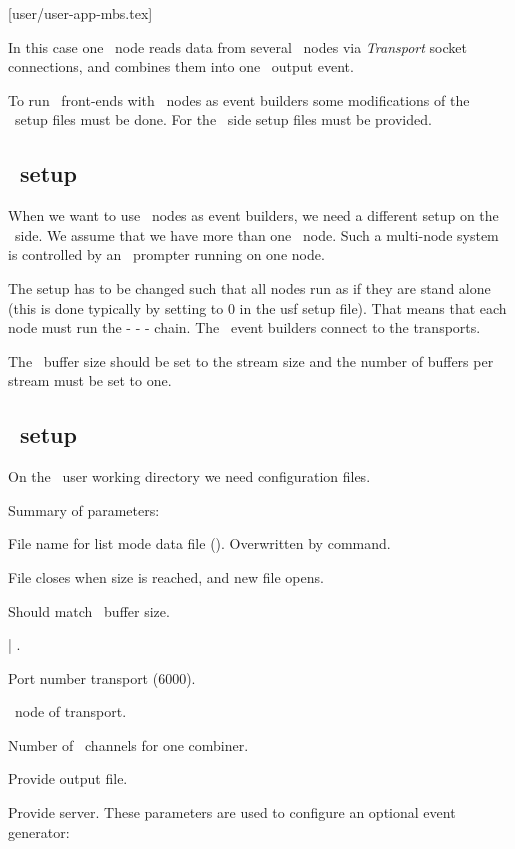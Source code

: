 [user/user-app-mbs.tex]
\label{user-app-mbs-chapter}


In this case one \dabc\ node reads data from several
\mbs\ nodes via {\em Transport} socket connections, and combines them
into one \mbs\ output event. 

To run \mbs\ front-ends with \dabc\ nodes as event builders some
modifications of the \mbs\ setup files must be done.
For the \dabc\ side setup files must be provided.

\subsection[MBS setup]{\mbs\ setup}
When we want to use \dabc\ nodes as event builders, we need a different
setup on the \mbs\ side. We assume that we have more than one
\mbs\ node. Such a multi-node system is controlled by an \mbs\ prompter running on one node.
\bbul
\item The setup has to be changed such that all nodes run as if they are stand alone
(this is done typically by setting  to 0 in the usf setup file).
That means that each node must run the  -  - 
 - 
chain. The \dabc\ event builders connect to the transports.
\item The \mbs\ buffer size should be set to the stream size and the number of buffers per
stream must be set to one.
\ebul

\subsection[DABC setup]{\dabc\ setup}
On the \dabc\ user working directory we need configuration files.

Summary of parameters:
\bdes
\item[MbsFileName] File name for list mode data file (). Overwritten by command.
\item[MbsFileSizeLimit] File closes when size is reached, and new file opens.
\item[BufferSize] Should match \mbs\ buffer size.
\item[MbsServerKind]  | .
\item[MbsServerPort] Port number transport (6000).
\item[MbsServerName] \mbs\ node of transport.
\item[NumInputs] Number of \mbs\ channels for one combiner.
\item[DoFile] Provide output file.
\item[DoServer] Provide server.
\edes
These parameters are used to configure an optional event generator:
\bdes
\item[NumSubevents]
\item[FirstProcId]
\item[SubeventSize]
\item[Go4Random]
\edes
{}

